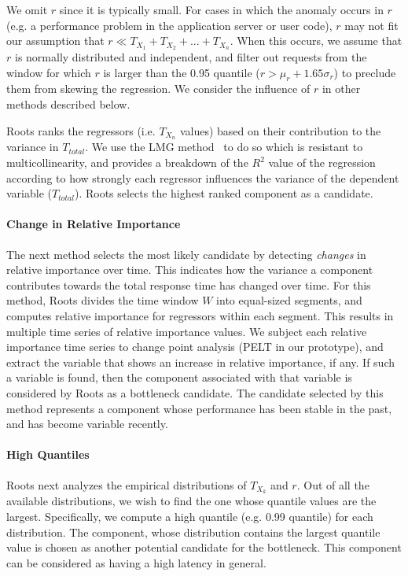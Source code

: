 We omit $r$ since it is typically small.
For cases in which the anomaly occurs in $r$ (e.g. a performance problem in the 
application server or user code), $r$ may
not fit our assumption that $r \ll T_{X_1} + T_{X_2} + ... + T_{X_n}$.  When this
occurs, we assume that $r$ is normally distributed and independent, and filter out
requests from the window for which $r$ is larger than the 0.95 quantile ($r > \mu_r + 1.65\sigma_r$)
to preclude them from skewing the regression. 
We consider the influence of $r$ in other methods described below.

Roots ranks the regressors (i.e. $T_{X_n}$ values) based on their contribution to the variance 
in $T_{total}$.  We use the LMG method~\cite{lmg80} to do so which is resistant to multicollinearity, 
and provides a breakdown of the $R^2$ value of
the regression according to how strongly each regressor influences
the variance of the dependent variable ($T_{total}$).
Roots selects the highest ranked component as a candidate.

\paragraph*{Change in Relative Importance}
The next method selects the most likely candidate by detecting \textit{changes} in relative importance
over time.
This indicates how the variance a component contributes towards the total response time has
changed over time.
For this method, Roots divides the time window $W$ into equal-sized segments,
and computes relative importance for regressors within each segment. 
This results in multiple time series of relative importance values.
We subject each relative importance time series to change point analysis (PELT in our prototype), 
and extract the variable that shows an increase in relative importance, if any.
If such a variable is found, then the component
associated with that variable is considered by Roots as a bottleneck candidate.
The candidate selected by this method represents
a component whose performance has been stable in the past, and has become variable recently.

\paragraph*{High Quantiles}
Roots next analyzes the empirical distributions of $T_{X_k}$ and $r$.
Out of all the available distributions,
we wish to find the one whose quantile values are the largest.
Specifically, we compute a high	
quantile (e.g. 0.99 quantile) for each distribution. The component, whose distribution
contains the largest quantile value
is chosen as another potential candidate for the bottleneck. This component can be considered
as having a high latency in general.

